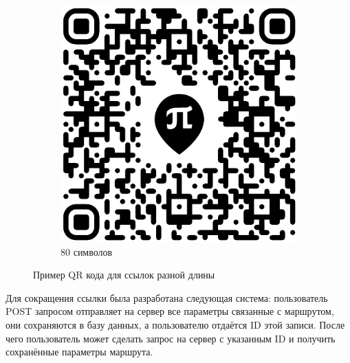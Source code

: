 \begin{figure}[H]
\begin{subfigure}[b]{.3\textwidth}
        \includegraphics[width=\textwidth]{assets/img/qr/80.pdf}
        \caption{80 символов}
      \end{subfigure}
      \caption{Пример QR кода для ссылок разной длины}
      \label{img:qrCompare}
    \end{figure}

    Для сокращения ссылки была разработана следующая система: пользователь POST запросом отправляет на сервер все параметры связанные с маршрутом, они сохраняются в базу данных, а пользователю отдаётся ID этой записи. После чего пользователь может сделать запрос на сервер с указанным ID и получить сохранённые параметры маршрута.

